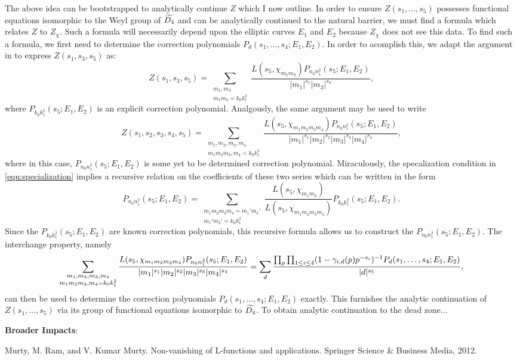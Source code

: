 \documentclass[12pt,reqno,oneside]{amsart}
\begin{document}
The above idea can be bootstrapped to analytically continue $Z$ which I now outline. In order to ensure $Z(s_{1},\ldots,s_{5})$ possesses functional equations isomorphic to the Weyl group of $\widetilde{D_{4}}$ and can be analytically continued to the natural barrier, we must find a formula which relates $Z$ to $Z_{\chi}$. Such a formula will necessarily depend upon the elliptic curves $E_{1}$ and $E_{2}$ because $Z_{\chi}$ does not see this data. To find such a formula, we first need to determine the correction polynomials $P_{d}(s_{1},\ldots,s_{4};E_{1},E_{2})$. In order to acomplish this, we adapt the argument in  to express $Z(s_{1},s_{3},s_{5})$ as:
\[
  Z(s_{1},s_{3},s_{5}) = \sum_{\substack{m_{1},m_{3} \\ m_{1}m_{3} = k_{0}k_{1}^{2}}}\frac{L(s_{5},\chi_{m_{1}m_{3}})P_{n_{0}n_{1}^{2}}(s_{5};E_{1},E_{2})}{|m_{1}|^{s_{1}}|m_{3}|^{s_{3}}},
\]
where $P_{k_{0}k_{1}^{2}}(s_{5};E_{1},E_{2})$ is an explicit correction polynomial. Analgously, the same argument may be used to write
\[
  Z(s_{1},s_{2},s_{3},s_{4},s_{5}) = \sum_{\substack{m_{1},m_{2},m_{3},m_{4} \\ m_{1}m_{2}m_{3},m_{4} = k_{0}k_{1}^{2}}}\frac{L(s_{5},\chi_{m_{1}m_{2}m_{3}m_{4}})P_{n_{0}n_{1}^{2}}(s_{5};E_{1},E_{2})}{|m_{1}|^{s_{1}}|m_{2}|^{s_{2}}|m_{3}|^{s_{3}}|m_{4}|^{s_{4}}},
\]
where in this case, $P_{n_{0}n_{1}^{2}}(s_{5};E_{1},E_{2})$ is some yet to be determined correction polynomial. Miraculously, the specalization condition in \cref{equ:specialization} implies a recursive relation on the coefficients of these two series which can be written in the form
\[
  P_{n_{0}n_{1}^{2}}(s_{5};E_{1},E_{2}) = \sum_{\substack{m_{1}m_{2}m_{3}m_{4} = m_{1}'m_{3}' \\ m_{1}'m_{3}' = k_{0}k_{1}^{2}}}\frac{L(s_{5},\chi_{m_{1}m_{3}})}{L(s_{5},\chi_{m_{1}m_{2}m_{3}m_{4}})}P_{k_{0}k_{1}^{2}}(s_{5};E_{1},E_{2}).
\]
Since the $P_{k_{0}k_{1}^{2}}(s_{5};E_{1},E_{2})$ are known correction polynomials, this recursive formula allows us to construct the $P_{n_{0}n_{1}^{2}}(s_{5};E_{1},E_{2})$. The interchange property, namely
\[
  \sum_{\substack{m_{1},m_{2},m_{3},m_{4} \\ m_{1}m_{2}m_{3},m_{4} = k_{0}k_{1}^{2}}}\frac{L(s_{5},\chi_{m_{1}m_{2}m_{3}m_{4}})P_{n_{0}n_{1}^{2}}(s_{5};E_{1},E_{2})}{|m_{1}|^{s_{1}}|m_{2}|^{s_{2}}|m_{3}|^{s_{3}}|m_{4}|^{s_{4}}} = \sum_{d}\frac{\prod_{p}\prod_{1 \le i \le 4}(1-\gamma_{i,d}(p)p^{-s_{i}})^{-1}P_{d}(s_{1},\ldots,s_{4};E_{1},E_{2})}{|d|^{s_{5}}},
\]
can then be used to determine the correction polynomials $P_{d}(s_{1},\ldots,s_{4};E_{1},E_{2})$ exactly. This furnishes the analytic continuation of $Z(s_{1},\ldots,s_{5})$ via its group of functional equations isomorphic to $\widetilde{D_{4}}$. To obtain analytic continuation to the dead zone...

\textbf{Broader Impacts}:

\begin{thebibliography}{}
  Murty, M. Ram, and V. Kumar Murty. Non-vanishing of L-functions and applications. Springer Science \& Business Media, 2012.
\end{thebibliography}
\end{document}
